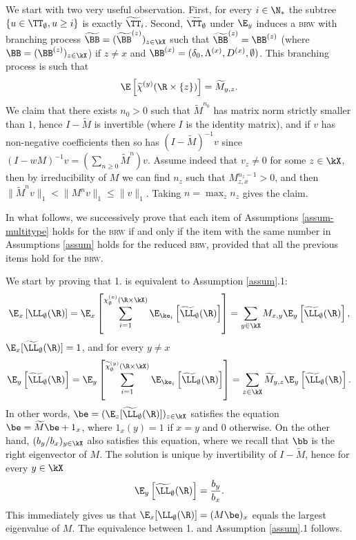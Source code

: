 \documentclass[10pt,a4paper]{article}
\newcommand{\brw}{\textsc{brw}\xspace}
\newcommand{\wM}{\widetilde{M}}
\renewcommand{\kx}{s}
\begin{document}
We start with two very useful observation. First, for every $i\in\N_*$ %
the subtree $\{ u\in\TT_\emptyset, u\geq i\}$ is exactly $\widetilde\TT_i$. Second, $\widetilde\TT_\emptyset$ under $\E_y$ induces a \brw with branching process $\widetilde\BB = (\widetilde\BB^{(z)})_{z\in\kX}$ such that $\widetilde \BB^{(z)} = \BB^{(z)}$ (where $\BB = (\BB^{(z)})_{z\in\kX}$) if $z\neq x$ and $\BB^{(x)} = (\delta_0, \Lambda^{(x)}, D^{(x)}, \emptyset)$. This branching process is such that
\[ \E\left[\widetilde\chi^{(y)}(\R\times\{z\}) \right] = \wM_{y,z} .
\]
We claim that there exists $n_0>0$ such that $\wM^{n_0}$ has matrix norm strictly smaller than $1$, hence $I-\wM$ is invertible (where $I$ is the identity matrix), and if $v$ has non-negative coefficients then so has $(I-\wM)^{-1}v$ since $(I-wM)^{-1} v = (\sum_{n\geq 0} \wM^n) v$. Assume indeed that $v_z\neq 0$ for some $z\in\kX$, then by irreducibility of $M$ we can find $n_z$ such that $M^{n_z-1}_{z,x}>0$, and then $\| \wM^n v \|_1 < \| M^n v\|_1 \leq \| v \|_1$. Taking $n = \max_z n_z$ gives the claim.%


In what follows, we successively prove that each item of Assumptions \ref{assum-multitype} holds for the \brw if and only if the item with the same number in Assumptions \ref{assum} holds for the reduced \brw, provided that all the previous items hold for the \brw. 


We start by proving that 1. is equivalent to Assumption \ref{assum}.1:
\begin{align*}
\E_x\left[ \LL_\emptyset(\R) \right] = \E_x\left[ \sum_{i=1}^{\chi^{(x)}_\emptyset(\R\times\kX)} \E_{\ke_i}\left[\widetilde\LL_\emptyset(\R) \right] \right] = \sum_{y\in\kX} M_{x,y} \E_y\left[\widetilde\LL_\emptyset(\R)\right] ,
\end{align*}
$\E_x[\widetilde\LL_\emptyset(\R)] = 1$, 
and for every $y\neq x$
\begin{align*}
\E_y\left[ \widetilde\LL_\emptyset(\R) \right] = \E_y\left[ \sum_{i=1}^{\widetilde\chi^{(y)}_\emptyset(\R\times\kX)} \E_{\ke_i}\left[\widetilde\LL_\emptyset(\R) \right] \right] = \sum_{z\in\kX} \wM_{y,z} \E_y\left[\widetilde\LL_\emptyset(\R)\right] .
\end{align*}
In other words, $\be = (\E_z[\widetilde\LL_\emptyset(\R)])_{z\in\kX}$ satisfies the equation $\be = \wM \be + 1_x$, where $1_x(y) = 1$ if $x=y$ and $0$ otherwise. On the other hand, $(b_y/b_x)_{y\in\kX}$ also satisfies this equation, where we recall that $\bb$ is the right eigenvector of $M$. The solution is unique by invertibility of $I-\wM$, hence for every $y\in\kX$
\begin{equation}
\E_y\left[\widetilde\LL_\emptyset(\R)\right] = \frac{b_y}{b_x} .
\end{equation}
This immediately gives us that $\E_x[\LL_\emptyset(\R)] = (M\be)_x$ equals the largest eigenvalue of $M$. The equivalence between 1. and Assumption \ref{assum}.1 follows.
\end{document}

